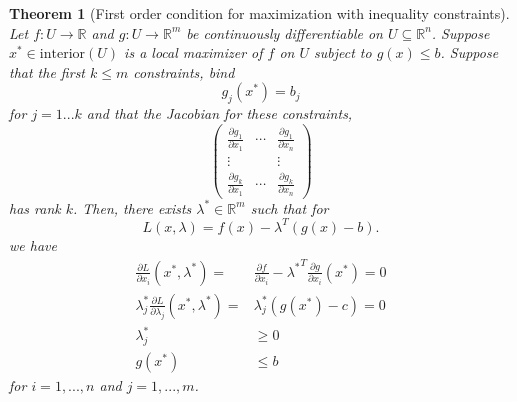 \documentclass[12pt,reqno]{amsart}
\newtheorem{theorem}{Theorem}[section]
\theoremstyle{definition}
\def\R{\mathbb{R}}
\renewcommand{\to}{{\rightarrow}}
\begin{document}
\begin{theorem}[First order condition for maximization with inequality constraints] \label{thm:icon}
  Let $f:U \to \R$ and $g: U \to \R^m$ be continuously
  differentiable on $U \subseteq \R^n$. Suppose $x^* \in
  \mathrm{interior}(U)$ is a local maximizer of $f$ on $U$ subject to 
  $g(x) \leq b$. Suppose that the first $k \leq m$ constraints, bind
  \[ g_j(x^*) = b_j \]
  for $j = 1 ... k$ and that the Jacobian for these constraints, 
  \[ \begin{pmatrix} 
    \frac{\partial g_1}{\partial x_1} &  \cdots &\frac{\partial g_1}{\partial x_n}  \\
    \vdots & & \vdots \\
    \frac{\partial g_k}{\partial x_1} &  \cdots &\frac{\partial g_k}{\partial x_n}  
  \end{pmatrix}
  \]
  has rank $k$. Then, there exists
  $\lambda^* \in \R^m$ such that for
  \[ L(x,\lambda) = f(x) - \lambda^T (g(x) - b). \]
  we have
  \begin{align*}
    \frac{\partial L}{\partial x_i}(x^*,\lambda^*) = & \frac{\partial
      f}{\partial x_i} - {\lambda^*}^T \frac{\partial g}{\partial
      x_i}(x^*) = 0 \\
    \lambda_j^* \frac{\partial L}{\partial \lambda_j}(x^*,\lambda^*) =
    & \lambda_j^* \left(g(x^*) - c \right)= 0 \\
    \lambda_j^* & \geq 0 \\
    g(x^*) & \leq b
  \end{align*}
  for $i = 1, ..., n$ and $j=1,...,m$.
\end{theorem}
\end{document}
